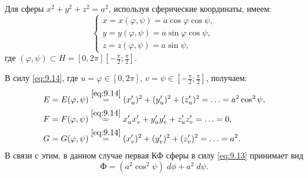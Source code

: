 \begin{example}$  $
    
    Для сферы $ x^2 + y^2 + z^2 = a^2 $, используя сферические координаты, имеем:
    \begin{equation*}
        \begin{cases}
            x = x(\varphi, \psi) = a \cos \varphi \cos \psi, \\
            y = y(\varphi, \psi) = a \sin \varphi \cos \psi, \\
            z = z(\varphi, \psi) = a \sin \psi, 
        \end{cases}
    \end{equation*}
    где $ (\varphi, \psi) \subset H = [0, 2\pi]  [-\frac{\pi}{2} ; \frac{\pi}{2}]$.
    
    В силу \eqref{eq:9.14}, где $ u = \varphi \in [0, 2 \pi] $, $ v = \psi \in[-\frac{\pi}{2} ; \frac{\pi}{2}] $, получаем:
    \begin{align*}
        & E = E(\varphi, \psi) \overset{\eqref{eq:9.14}}{=} (x_u')^2 + (y_u')^2 + (z_u')^2 = \ldots = a^2 \cos^2\psi, \\
        & F = F(\varphi, \psi) \overset{\eqref{eq:9.14}}{=} x_u' x_v' + y_u' y_v' + z_u' z_v' = \ldots = 0, \\
        & G = G(\varphi, \psi) \overset{\eqref{eq:9.14}}{=} (x_v')^2 + (y_v')^2 + (z_v')^2 = \ldots = a^2.
    \end{align*}
    В связи с этим, в данном случае первая КФ сферы в силу \eqref{eq:9.13} принимает вид
    \begin{equation*}
        \text{Ф} = (a^2 \cos^2 \psi) \; d \phi + a^2 \; d \psi.
    \end{equation*}
    

\end{example}

